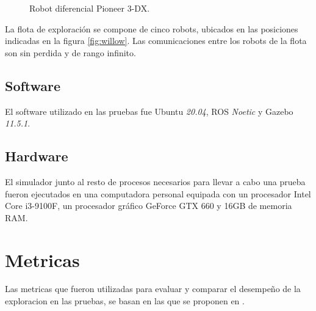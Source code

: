 \begin{figure}[H]
  \centerfloat

  \qquad

  \caption[Robot diferencial Pioneer 3-DX.]{Robot diferencial Pioneer 3-DX.}\label{fig:p3dx}

\end{figure}

La flota de exploración se compone de cinco robots, ubicados en las posiciones
indicadas en la figura \ref{fig:willow}. Las comunicaciones entre los robots de
la flota son sin perdida y de rango infinito.

\subsection{Software}
El software utilizado en las pruebas fue Ubuntu \emph{20.04}, ROS \emph{Noetic} y Gazebo
\emph{11.5.1}. 

\subsection{Hardware}
El simulador junto al resto de procesos necesarios para llevar a cabo una
prueba fueron ejecutados en una computadora personal equipada con un procesador
Intel Core i3-9100F, un procesador gráfico GeForce GTX 660 y 16GB de memoria
RAM.


\section{Metricas}
Las metricas que fueron utilizadas para evaluar y comparar el desempeño de la
exploracion en las pruebas, se basan en las que se proponen en
\cite{yan2015metrics}.



